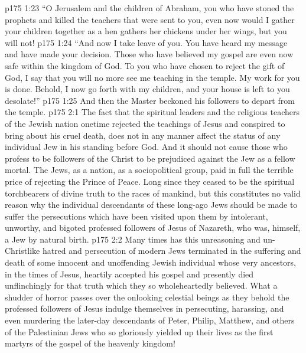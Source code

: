 \vs p175 1:23 \textcolor{ubdarkred}{“O Jerusalem and the children of Abraham, you who have stoned the prophets and killed the teachers that were sent to you, even now would I gather your children together as a hen gathers her chickens under her wings, but you will not!}
\vs p175 1:24 \textcolor{ubdarkred}{“And now I take leave of you. You have heard my message and have made your decision. Those who have believed my gospel are even now safe within the kingdom of God. To you who have chosen to reject the gift of God, I say that you will no more see me teaching in the temple. My work for you is done. Behold, I now go forth with my children, and your house is left to you desolate!”}\plusone
\vs p175 1:25 And then the Master beckoned his followers to depart from the temple.
\vs p175 2:1 The fact that the spiritual leaders and the religious teachers of the Jewish nation onetime rejected the teachings of Jesus and conspired to bring about his cruel death, does not in any manner affect the status of any individual Jew in his standing before God. And it should not cause those who profess to be followers of the Christ to be prejudiced against the Jew as a fellow mortal. The Jews, as a nation, as a sociopolitical group, paid in full the terrible price of rejecting the Prince of Peace. Long since they ceased to be the spiritual torchbearers of divine truth to the races of mankind, but this constitutes no valid reason why the individual descendants of these long\hyp{}ago Jews should be made to suffer the persecutions which have been visited upon them by intolerant, unworthy, and bigoted professed followers of Jesus of Nazareth, who was, himself, a Jew by natural birth.
\vs p175 2:2 Many times has this unreasoning and un\hyp{}Christlike hatred and persecution of modern Jews terminated in the suffering and death of some innocent and unoffending Jewish individual whose very ancestors, in the times of Jesus, heartily accepted his gospel and presently died unflinchingly for that truth which they so wholeheartedly believed. What a shudder of horror passes over the onlooking celestial beings as they behold the professed followers of Jesus indulge themselves in persecuting, harassing, and even murdering the later\hyp{}day descendants of Peter, Philip, Matthew, and others of the Palestinian Jews who so gloriously yielded up their lives as the first martyrs of the gospel of the heavenly kingdom!
